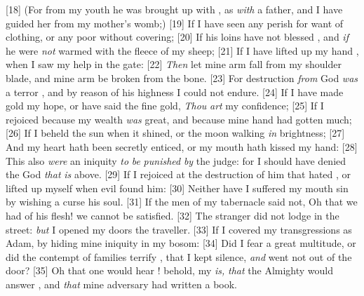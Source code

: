 [18] \textcolor[cmyk]{0.99998,1,0,0}{(For from my youth he was brought up with  , as \emph{with} a father, and I have guided her from my mother's womb;)}
[19] \textcolor[cmyk]{0.99998,1,0,0}{If I have seen any perish for want of clothing, or any poor without covering;}
[20] \textcolor[cmyk]{0.99998,1,0,0}{If his loins have not blessed  , and \emph{if} he were \emph{not} warmed with the fleece of my sheep;}
[21] \textcolor[cmyk]{0.99998,1,0,0}{If I have lifted up my hand , when I saw my help in the gate:}
[22] \textcolor[cmyk]{0.99998,1,0,0}{\emph{Then} let mine arm fall from my shoulder blade, and mine arm be broken from the bone.}
[23] \textcolor[cmyk]{0.99998,1,0,0}{For destruction \emph{from} God \emph{was} a terror    , and by reason of his highness I could not endure.}
[24] \textcolor[cmyk]{0.99998,1,0,0}{If I have made gold my hope, or have said   the fine gold, \emph{Thou} \emph{art} my confidence;}
[25] \textcolor[cmyk]{0.99998,1,0,0}{If I rejoiced because my wealth \emph{was} great, and because mine hand had gotten much;}
[26] \textcolor[cmyk]{0.99998,1,0,0}{If I beheld the sun when it shined, or the moon walking \emph{in} brightness;}
[27] \textcolor[cmyk]{0.99998,1,0,0}{And my heart hath been secretly enticed, or my mouth hath kissed my hand:}
[28] \textcolor[cmyk]{0.99998,1,0,0}{This also \emph{were} an iniquity \emph{to} \emph{be} \emph{punished} \emph{by} the judge: for I should have denied the God \emph{that} \emph{is} above.}
[29] \textcolor[cmyk]{0.99998,1,0,0}{If I rejoiced at the destruction of him that hated  , or lifted up myself when evil found him:}
[30] \textcolor[cmyk]{0.99998,1,0,0}{Neither have I suffered my mouth   sin by wishing a curse   his soul.}
[31] \textcolor[cmyk]{0.99998,1,0,0}{If the men of my tabernacle said not, Oh that we had of his flesh! we cannot be satisfied.}
[32] \textcolor[cmyk]{0.99998,1,0,0}{The stranger did not lodge in the street: \emph{but} I opened my doors   the traveller.}
[33] \textcolor[cmyk]{0.99998,1,0,0}{If I covered my transgressions as Adam, by hiding mine iniquity in my bosom:}
[34] \textcolor[cmyk]{0.99998,1,0,0}{Did I fear a great multitude, or did the contempt of families terrify  , that I kept silence, \emph{and} went not out of the door?}
[35] \textcolor[cmyk]{0.99998,1,0,0}{Oh that one would hear  ! behold, my  \emph{is,} \emph{that} the Almighty would answer  , and \emph{that} mine adversary had written a book.}
